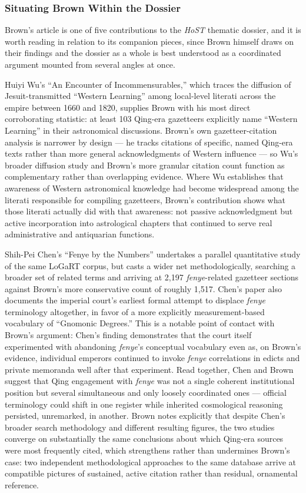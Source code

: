 \documentclass[10pt]{article}
\begin{document}
\subsubsection*{Situating Brown Within the Dossier}

Brown's article is one of five contributions to the \emph{HoST} thematic dossier, and it is worth reading in relation to its companion pieces, since Brown himself draws on their findings and the dossier as a whole is best understood as a coordinated argument mounted from several angles at once.

Huiyi Wu's ``An Encounter of Incommensurables,'' which traces the diffusion of Jesuit-transmitted ``Western Learning'' among local-level literati across the empire between 1660 and 1820, supplies Brown with his most direct corroborating statistic: at least 103 Qing-era gazetteers explicitly name ``Western Learning'' in their astronomical discussions. Brown's own gazetteer-citation analysis is narrower by design --- he tracks citations of specific, named Qing-era texts rather than more general acknowledgments of Western influence --- so Wu's broader diffusion study and Brown's more granular citation count function as complementary rather than overlapping evidence. Where Wu establishes that awareness of Western astronomical knowledge had become widespread among the literati responsible for compiling gazetteers, Brown's contribution shows what those literati actually did with that awareness: not passive acknowledgment but active incorporation into astrological chapters that continued to serve real administrative and antiquarian functions.

Shih-Pei Chen's ``Fenye by the Numbers'' undertakes a parallel quantitative study of the same LoGaRT corpus, but casts a wider net methodologically, searching a broader set of related terms and arriving at 2,197 \emph{fenye}-related gazetteer sections against Brown's more conservative count of roughly 1,517. Chen's paper also documents the imperial court's earliest formal attempt to displace \emph{fenye} terminology altogether, in favor of a more explicitly measurement-based vocabulary of ``Gnomonic Degrees.'' This is a notable point of contact with Brown's argument: Chen's finding demonstrates that the court itself experimented with abandoning \emph{fenye}'s conceptual vocabulary even as, on Brown's evidence, individual emperors continued to invoke \emph{fenye} correlations in edicts and private memoranda well after that experiment. Read together, Chen and Brown suggest that Qing engagement with \emph{fenye} was not a single coherent institutional position but several simultaneous and only loosely coordinated ones --- official terminology could shift in one register while inherited cosmological reasoning persisted, unremarked, in another. Brown notes explicitly that despite Chen's broader search methodology and different resulting figures, the two studies converge on substantially the same conclusions about which Qing-era sources were most frequently cited, which strengthens rather than undermines Brown's case: two independent methodological approaches to the same database arrive at compatible pictures of sustained, active citation rather than residual, ornamental reference.
\end{document}
